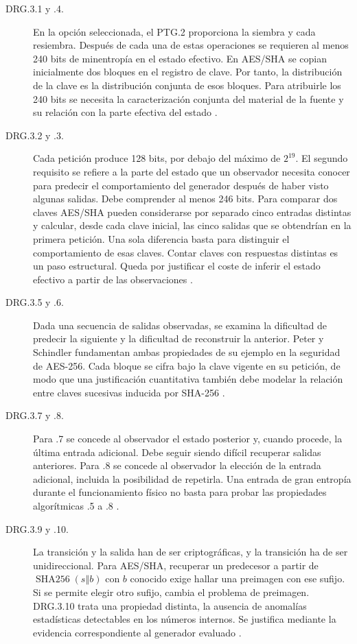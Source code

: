 \documentclass[11pt,a4paper]{article}
\newcommand{\HH}{\operatorname{SHA256}}
\newcommand{\cat}{\mathbin\Vert}
\begin{document}
\begin{description}
\item[DRG.3.1 y .4.] En la opción seleccionada, el PTG.2 proporciona la siembra y cada resiembra. Después de cada una de estas operaciones se requieren al menos 240 bits de minentropía en el estado efectivo. En AES/SHA se copian inicialmente dos bloques en el registro de clave. Por tanto, la distribución de la clave es la distribución conjunta de esos bloques. Para atribuirle los 240 bits se necesita la caracterización conjunta del material de la fuente y su relación con la parte efectiva del estado \cite[párrs.~143--150 y 207]{ais}.
\item[DRG.3.2 y .3.] Cada petición produce 128 bits, por debajo del máximo de \(2^{19}\). El segundo requisito se refiere a la parte del estado que un observador necesita conocer para predecir el comportamiento del generador después de haber visto algunas salidas. Debe comprender al menos 246 bits. Para comparar dos claves AES/SHA pueden considerarse por separado cinco entradas distintas y calcular, desde cada clave inicial, las cinco salidas que se obtendrían en la primera petición. Una sola diferencia basta para distinguir el comportamiento de esas claves. Contar claves con respuestas distintas es un paso estructural. Queda por justificar el coste de inferir el estado efectivo a partir de las observaciones \cite[párrs.~91--103, 114--115 y 207]{ais}.
\item[DRG.3.5 y .6.] Dada una secuencia de salidas observadas, se examina la dificultad de predecir la siguiente y la dificultad de reconstruir la anterior. Peter y Schindler fundamentan ambas propiedades de su ejemplo en la seguridad de AES-256. Cada bloque se cifra bajo la clave vigente en su petición, de modo que una justificación cuantitativa también debe modelar la relación entre claves sucesivas inducida por SHA-256 \cite[párrs.~207, 211 y 998]{ais}.
\item[DRG.3.7 y .8.] Para .7 se concede al observador el estado posterior y, cuando procede, la última entrada adicional. Debe seguir siendo difícil recuperar salidas anteriores. Para .8 se concede al observador la elección de la entrada adicional, incluida la posibilidad de repetirla. Una entrada de gran entropía durante el funcionamiento físico no basta para probar las propiedades algorítmicas .5 a .8 \cite[párrs.~207 y 211--214]{ais}.
\item[DRG.3.9 y .10.] La transición y la salida han de ser criptográficas, y la transición ha de ser unidireccional. Para AES/SHA, recuperar un predecesor a partir de \(\HH(s\cat b)\) con \(b\) conocido exige hallar una preimagen con ese sufijo. Si se permite elegir otro sufijo, cambia el problema de preimagen. DRG.3.10 trata una propiedad distinta, la ausencia de anomalías estadísticas detectables en los números internos. Se justifica mediante la evidencia correspondiente al generador evaluado \cite[párrs.~200, 205, 207, 209, 212--215 y 998]{ais}.
\end{description}
\end{document}
